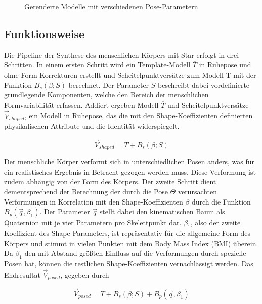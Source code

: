 \begin{figure}[H]
  \centering 
   \qquad 
  \caption{Gerenderte Modelle mit verschiedenen Pose-Parametern} 
  \label{fig:poses}
\end{figure}

\subsection{Funktionsweise}

Die Pipeline der Synthese des menschlichen Körpers mit Star erfolgt in drei Schritten. In einem ersten Schritt wird ein
Template-Modell $\overline{T}$ in Ruhepose und ohne Form-Korrekturen erstellt und Scheitelpunktversätze zum Modell T mit der Funktion
$B_s(\beta;S)$ berechnet. Der Parameter $S$ beschreibt dabei vordefinierte grundlegende Komponenten, welche den Bereich der
menschlichen Formvariabilität erfassen. Addiert ergeben Modell $\overline{T}$ und Scheitelpunktversätze
$\vec{V}_{shaped}$, ein Modell in Ruhepose,
das die mit den Shape-Koeffizienten definierten physikalischen Attribute und die Identität widerspiegelt.

\begin{equation}\label{eq:Star_Vshaped}
  \vec{V}_{shaped}=\overline{T}+B_s(\beta;S)
\end{equation}

Der menschliche Körper verformt sich in unterschiedlichen Posen anders, was für ein realistisches Ergebnis in Betracht
gezogen werden muss. Diese Verformung ist zudem abhängig von der Form des Körpers. Der zweite Schritt dient dementsprechend der
Berechnung der durch die Pose $\Theta$ verursachten Verformungen in Korrelation mit den Shape-Koeffizienten $\beta$ durch die Funktion
$B_p(\vec{q},\beta _1) $. Der Parameter $\vec{q}$ stellt dabei den kinematischen Baum als Quaternion mit je vier
Parametern pro Skelettpunkt dar. $\beta _1$, also der
zweite Koeffizient des Shape-Parameters, ist repräsentativ für die allgemeine Form des Körpers und stimmt in vielen
Punkten mit dem Body Mass Index (BMI) überein. Da $\beta _1$ den mit Abstand größten Einfluss auf die Verformungen durch
spezielle Posen hat, können die restlichen Shape-Koeffizienten vernachlässigt werden. Das Endresultat $\vec{V}_{posed}$, gegeben
durch

\begin{equation}\label{eq:Star_Vposed}
  \vec{V}_{posed}=\overline{T}+B_s(\beta;S)+B_p(\vec{q},\beta _1)
\end{equation}

